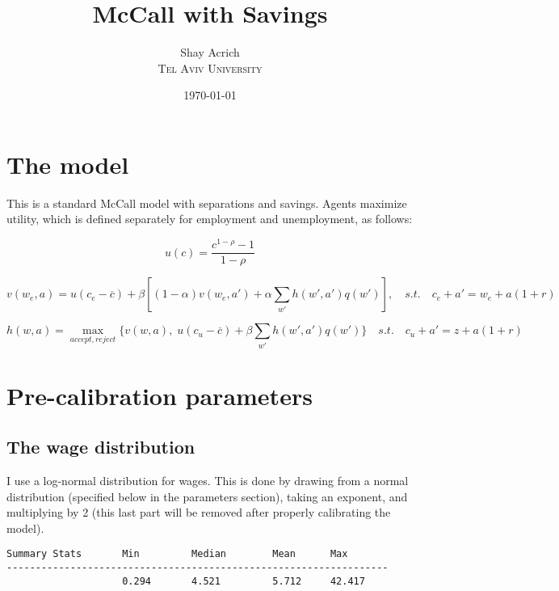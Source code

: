 \documentclass[12pt]{article}
\title{McCall with Savings} %
\author{Shay Acrich\\ %
\textsc{Tel Aviv University}
}
\date{\today} %
\begin{document}
\setlength{\droptitle}{-5em}
\maketitle


\tableofcontents

\newpage

\section{The model}

This is a standard McCall model with separations and savings. Agents maximize utility, which is defined separately for employment and unemployment, as follows:

\begin{equation}
    u(c) = \frac{c^{1 - \rho} - 1}{1 - \rho}
\end{equation}

\begin{equation}
    v(w_e, a) = u(c_e - \overline{c}) + \beta [(1 - \alpha) v(w_e, a') + \alpha \sum_{w'} h(w', a') q(w')], \quad s.t. \quad c_e + a' = w_e + a (1 + r)
\end{equation}

\begin{equation}
    h(w,a) = \max_{accept,reject} \{ v(w,a), \; u(c_u - \overline{c}) + \beta \sum_{w'} h(w', a') q(w') \} \quad s.t. \quad c_u + a' = z + a (1 + r)
\end{equation}

\newpage

\section{Pre-calibration parameters}

\subsection{The wage distribution}

I use a log-normal distribution for wages. This is done by drawing from a normal distribution (specified below in the parameters section), taking an exponent, and multiplying by 2 (this last part will be removed after properly calibrating the model).

\begin{Verbatim}[frame = single, fontsize = \footnotesize]
Summary Stats       Min         Median        Mean      Max
------------------------------------------------------------------
                    0.294       4.521         5.712     42.417
\end{Verbatim}
\end{document}
